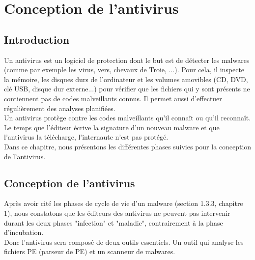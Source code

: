 \chapter{Conception de l'antivirus}
\section{Introduction}
Un antivirus est un logiciel de protection dont le but est de détecter les malwares (comme par exemple les virus, vers, chevaux de Troie, ...). Pour cela, il inspecte la mémoire, les disques durs de l'ordinateur et les volumes amovibles (CD, DVD, clé USB, disque dur externe...) pour vérifier que les fichiers qui y sont présents ne contiennent pas de codes malveillants connus. Il permet aussi d'effectuer régulièrement des analyses planifiées.\\

Un antivirus protège contre les codes malveillants qu'il connaît ou qu'il reconnaît. Le temps que l'éditeur écrive la signature d’un nouveau malware et que l'antivirus la télécharge, l'internaute n'est pas protégé.\\

Dans ce chapitre, nous présentons les différentes phases suivies pour la conception  de l'antivirus.

\section{Conception de l'antivirus} 
Après avoir cité les phases de cycle de vie d'un malware (section 1.3.3, chapitre 1), nous constatons que les éditeurs des antivirus ne peuvent pas intervenir durant les deux phases "infection" et "maladie", contrairement à la phase d'incubation.\\

Donc l'antivirus sera composé de deux outils essentiels. Un outil qui analyse les fichiers PE (parseur de PE)  et un  scanneur de malwares.\\

